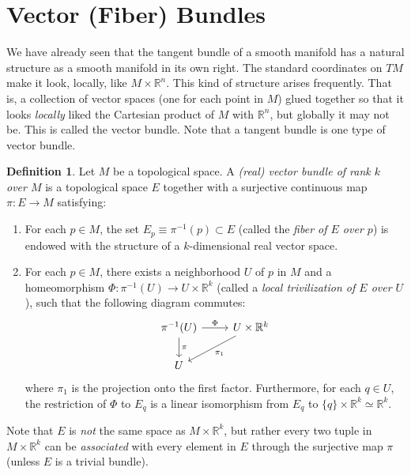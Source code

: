 \documentclass{article}
\theoremstyle{remark}
\theoremstyle{definition}
\newtheorem{definition}{Definition}[section]
\begin{document}
\section{Vector (Fiber) Bundles}

  We have already seen that the tangent bundle of a smooth manifold has a natural structure as a smooth manifold in its own right. The standard coordinates on $TM$ make it look, locally, like $M \times \mathbb{R}^n$. This kind of structure arises frequently. That is, a collection of vector spaces (one for each point in $M$) glued together so that it looks \textit{locally} liked the Cartesian product of $M$ with $\mathbb{R}^n$, but globally it may not be. This is called the vector bundle. Note that a tangent bundle is one type of vector bundle. 

  \begin{definition}
  Let $M$ be a topological space. A \textit{(real) vector bundle of rank $k$ over $M$} is a topological space $E$ together with a surjective continuous map $\pi: E \longrightarrow M$ satisfying: 
  \begin{enumerate}
      \item For each $p \in M$, the set $E_p \equiv \pi^{-1} (p) \subset E$ (called the \textit{fiber of $E$ over $p$}) is endowed with the structure of a $k$-dimensional real vector space. 
      \item For each $p \in M$, there exists a neighborhood $U$ of $p$ in $M$ and a homeomorphism $\Phi: \pi^{-1}(U) \longrightarrow U \times \mathbb{R}^k$ (called a \textit{local trivilization of $E$ over $U$}), such that the following diagram commutes: 
      \[\begin{tikzcd}
      \pi^{-1}(U) \arrow{r}{\Phi} \arrow{d}{\pi}& U \times \mathbb{R}^k \arrow{ld}{\pi_1}\\
      U 
      \end{tikzcd}\]
      where $\pi_1$ is the projection onto the first factor. Furthermore, for each $q \in U$, the restriction of $\Phi$ to $E_q$ is a linear isomorphism from $E_q$ to $\{q\} \times \mathbb{R}^k \simeq \mathbb{R}^k$. 
  \end{enumerate}
  \end{definition}

  Note that $E$ is \textit{not} the same space as $M \times \mathbb{R}^k$, but rather every two tuple in $M \times \mathbb{R}^k$ can be \textit{associated} with every element in $E$ through the surjective map $\pi$ (unless $E$ is a trivial bundle). 
\end{document}
